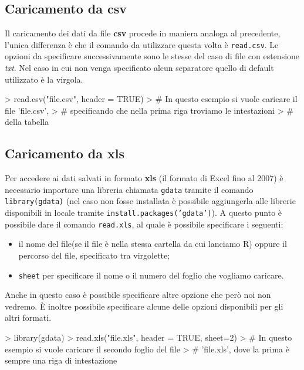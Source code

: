 \subsection{Caricamento da csv}
Il caricamento dei dati da file \textbf{csv} procede in maniera analoga al 
precedente, l'unica differenza è che il comando da utilizzare questa volta è
\texttt{read.csv}. Le opzioni da specificare successivamente sono le stesse
del caso di file con estensione \emph{txt}. Nel caso in cui non venga 
specificato alcun separatore quello di default utilizzato è la virgola.
\begin{Schunk}
\begin{Sinput}
> read.csv("file.csv", header = TRUE)
> # In questo esempio si vuole caricare il file 'file.csv',
> # specificando che nella prima riga troviamo le intestazioni 
> # della tabella
\end{Sinput}
\end{Schunk}

\subsection{Caricamento da xls}
Per accedere ai dati salvati in formato \textbf{xls} (il formato di Excel 
fino al 2007) è necessario importare una libreria chiamata \texttt{gdata}
tramite il comando \texttt{library(gdata)} (nel caso non fosse installata
è possibile aggiungerla alle librerie disponibili in locale tramite 
\texttt{install.packages('gdata')}). A questo punto è possibile dare il 
comando \texttt{read.xls}, al quale è possibile specificare i seguenti:
\begin{itemize}
  \item il nome del file(se il file è nella stessa cartella da cui lanciamo R)
  oppure il percorso del file, specificato tra virgolette;
  \item \texttt{sheet} per specificare il nome o il numero del foglio che 
  vogliamo caricare.
\end{itemize}
Anche in questo caso è possibile specificare altre opzione che però noi non 
vedremo. È inoltre possibile specificare alcune delle opzioni disponibili per 
gli altri formati.
\begin{Schunk}
\begin{Sinput}
> library(gdata)
> read.xls("file.xls", header = TRUE, sheet=2)
> # In questo esempio si vuole caricare il secondo foglio del file 
> # 'file.xls', dove la prima è sempre una riga di intestazione
\end{Sinput}
\end{Schunk}

